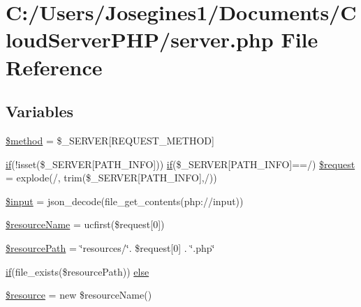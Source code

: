 \hypertarget{server_8php}{}\section{C\+:/\+Users/\+Josegines1/\+Documents/\+Cloud\+Server\+P\+H\+P/server.php File Reference}
\label{server_8php}
\subsection*{Variables}
\begin{DoxyCompactItemize}
\item 
\mbox{\hyperlink{server_8php_a12661b2fc0f57f97e30a1620889ce9c6}{\$method}} = \$\+\_\+\+S\+E\+R\+V\+ER\mbox{[}\textquotesingle{}R\+E\+Q\+U\+E\+S\+T\+\_\+\+M\+E\+T\+H\+OD\textquotesingle{}\mbox{]}
\item 
\mbox{\hyperlink{login_8php_a1e9ad7645a82f87ff70cac2447de1c76}{if}}(!isset(\$\+\_\+\+S\+E\+R\+V\+ER\mbox{[}\textquotesingle{}P\+A\+T\+H\+\_\+\+I\+N\+FO\textquotesingle{}\mbox{]})) \mbox{\hyperlink{login_8php_a1e9ad7645a82f87ff70cac2447de1c76}{if}}(\$\+\_\+\+S\+E\+R\+V\+ER\mbox{[}\textquotesingle{}P\+A\+T\+H\+\_\+\+I\+N\+FO\textquotesingle{}\mbox{]}==\textquotesingle{}/\textquotesingle{}) \mbox{\hyperlink{server_8php_ab3ec6974bfb1f783f0795e30a91875ec}{\$request}} = explode(\textquotesingle{}/\textquotesingle{}, trim(\$\+\_\+\+S\+E\+R\+V\+ER\mbox{[}\textquotesingle{}P\+A\+T\+H\+\_\+\+I\+N\+FO\textquotesingle{}\mbox{]},\textquotesingle{}/\textquotesingle{}))
\item 
\mbox{\hyperlink{server_8php_a69b271260be394b90709736cccb22c76}{\$input}} = json\+\_\+decode(file\+\_\+get\+\_\+contents(\textquotesingle{}php\+://input\textquotesingle{}))
\item 
\mbox{\hyperlink{server_8php_adc0aed0ec6bf7959e25cdf7dae66b419}{\$resource\+Name}} = ucfirst(\$request\mbox{[}0\mbox{]})
\item 
\mbox{\hyperlink{server_8php_a45672661be8a848a007ec8ea5a2c517a}{\$resource\+Path}} = \char`\"{}resources/\char`\"{}. \$request\mbox{[}0\mbox{]} . \char`\"{}.php\char`\"{}
\item 
\mbox{\hyperlink{login_8php_a1e9ad7645a82f87ff70cac2447de1c76}{if}}(file\+\_\+exists(\$resource\+Path)) \mbox{\hyperlink{server_8php_a1b9d67b931db67e9db40d1770cb07eae}{else}}
\item 
\mbox{\hyperlink{server_8php_abd4c7b8b084214b8d2533ba07fce6b83}{\$resource}} = new \$resource\+Name()
\end{DoxyCompactItemize}


